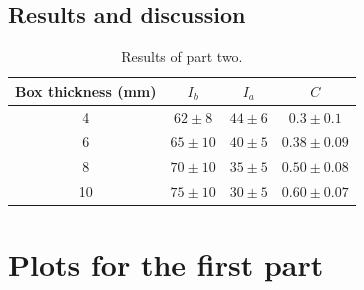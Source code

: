 \documentclass[a4paper]{article}
\begin{document}
\subsection{Results and discussion}
\begin{table}[H]
  \centering
  \begin{tabular}{|c|c|c|c|}
    \hline
    Box thickness (mm) & $I_{b}$ & $I_{a}$ & $C$ \\
    \hline
    4 & $62 \pm 8$ & $44 \pm 6$ & $0.3 \pm 0.1$\\
    \hline
    6 & $65 \pm 10$ & $40 \pm 5$ & $0.38 \pm 0.09$\\
    \hline
    8 & $70 \pm 10$ & $35 \pm 5$ & $0.50 \pm 0.08$ \\
    \hline
    10 & $75 \pm 10$ & $30 \pm 5$ & $0.60 \pm 0.07$\\
    \hline
  \end{tabular}
  \caption{Results of part two.}
  \label{tab:part_two}
\end{table}

\clearpage


\appendix

\section{Plots for the first part}
\label{sec:appendix_1}
\end{document}
